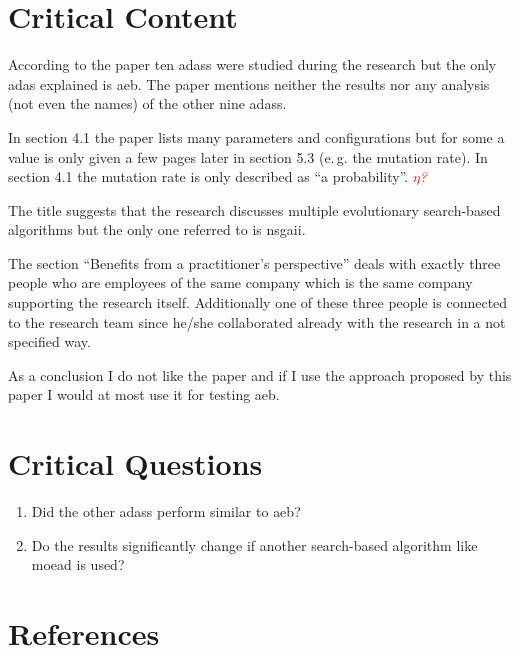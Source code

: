 \documentclass[oneside, notitlepage, twocolumn]{scrartcl}
\newcommand{\draft}[1]{\textcolor{red}{\textit{#1}}}
\newcommand{\eg}{e.\,g.\xspace}
\begin{document}
\section{Critical Content}
According to the paper ten \glspl{adas} were studied during the research but the only \gls{adas} explained is \gls{aeb}.
The paper mentions neither the results nor any analysis (not even the names) of the other nine \glspl{adas}.\par
In section 4.1 the paper lists many parameters and configurations but for some a value is only given a few pages later in section 5.3 (\eg{} the mutation rate).
In section 4.1 the mutation rate is only described as ``a probability''.
\draft{\(\eta\)?}\par
The title suggests that the research discusses multiple evolutionary search-based algorithms but the only one referred to is \gls{nsgaii}.\par
The section ``Benefits from a practitioner's perspective'' deals with exactly three people who are employees of the same company which is the same company supporting the research itself.
Additionally one of these three people is connected to the research team since he/she collaborated already with the research in a not specified way.\par
As a conclusion I do not like the paper and if I use the approach proposed by this paper I would at most use it for testing \gls{aeb}.

\section{Critical Questions}
\begin{enumerate}
    \item Did the other \glspl{adas} perform similar to \gls{aeb}?
    \item Do the results significantly change if another search-based algorithm like \gls{moead} is used?
\end{enumerate}

\printglossary[type=\acronymtype, title=List of Abbreviations]

\section{References}
\begingroup
\renewcommand{\section}[2]{}%
\nocite{*}
\printbibliography%
\endgroup
\end{document}
